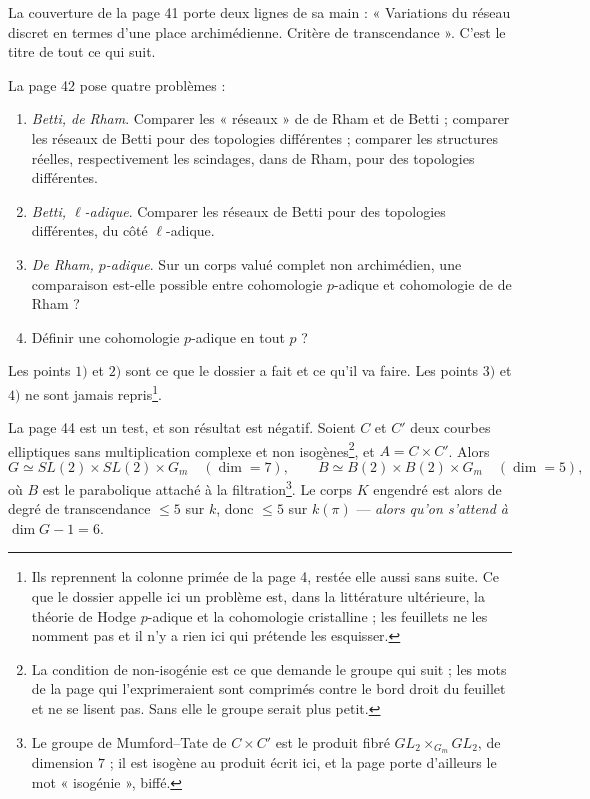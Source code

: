 \documentclass[11pt,a4paper]{article}
\begin{document}
La couverture de la page 41 porte deux lignes de sa main : « Variations du
réseau discret en termes d'une place archimédienne. Critère de transcendance ».
C'est le titre de tout ce qui suit.

La page 42 pose quatre problèmes :

\begin{enumerate}
  \item[1)] \emph{Betti, de Rham}. Comparer les « réseaux » de de Rham et de
        Betti ; comparer les réseaux de Betti pour des topologies différentes ;
        comparer les structures réelles, respectivement les scindages, dans de
        Rham, pour des topologies différentes.
  \item[2)] \emph{Betti, $\ell$-adique}. Comparer les réseaux de Betti pour des
        topologies différentes, du côté $\ell$-adique.
  \item[3)] \emph{De Rham, $p$-adique}. Sur un corps valué complet non
        archimédien, une comparaison est-elle possible entre cohomologie
        $p$-adique et cohomologie de de Rham ?
  \item[4)] Définir une cohomologie $p$-adique en tout $p$ ?
\end{enumerate}

Les points $1)$ et $2)$ sont ce que le dossier a fait et ce qu'il va faire. Les
points $3)$ et $4)$ ne sont jamais repris\footnote{Ils reprennent la colonne
primée de la page 4, restée elle aussi sans suite. Ce que le dossier appelle ici
un problème est, dans la littérature ultérieure, la théorie de Hodge $p$-adique
et la cohomologie cristalline ; les feuillets ne les nomment pas et il n'y a
rien ici qui prétende les esquisser.}.

La page 44 est un test, et son résultat est négatif. Soient $C$ et $C'$ deux
courbes elliptiques sans multiplication complexe et non isogènes\footnote{La
condition de non-isogénie est ce que demande le groupe qui suit ; les mots de la
page qui l'exprimeraient sont comprimés contre le bord droit du feuillet et ne
se lisent pas. Sans elle le groupe serait plus petit.}, et $A = C \times C'$.
Alors
\[
  G \simeq SL(2) \times SL(2) \times G_{m} \quad (\dim = 7) ,
  \qquad
  B \simeq B(2) \times B(2) \times G_{m} \quad (\dim = 5) ,
\]
où $B$ est le parabolique attaché à la filtration\footnote{Le groupe de
Mumford--Tate de $C \times C'$ est le produit fibré $GL_{2} \times_{G_{m}}
GL_{2}$, de dimension $7$ ; il est isogène au produit écrit ici, et la page
porte d'ailleurs le mot « isogénie », biffé.}. Le corps $K$ engendré est alors
de degré de transcendance $\leqslant 5$ sur $k$, donc $\leqslant 5$ sur
$k(\pi)$ — \emph{alors qu'on s'attend à $\dim G - 1 = 6$}.
\end{document}
